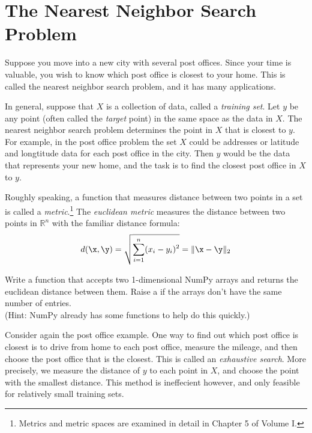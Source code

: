 \label{lab:DS3}


\section*{The Nearest Neighbor Search Problem} %

Suppose you move into a new city with several post offices.
Since your time is valuable, you wish to know which post office is closest to your home.
This is called the nearest neighbor search problem, and it has many applications.

In general, suppose that $X$ is a collection of data, called a \emph{training set}.
Let $y$ be any point (often called the \emph{target} point) in the same space as the data in $X$.
The nearest neighbor search problem determines the point in $X$ that is closest to $y$.
For example, in the post office problem the set $X$ could be addresses or latitude and longtitude data for each post office in the city.
Then $y$ would be the data that represents your new home, and the task is to find the closest post office in $X$ to $y$.

\begin{problem} %
Roughly speaking, a function that measures distance between two points in a set is called a \emph{metric}.\footnote{Metrics and metric spaces are examined in detail in Chapter 5 of Volume I.}
The \emph{euclidean metric} measures the distance between two points in $\mathbb{R}^n$ with the familiar distance formula:
\[
d(\x,\y) = \sqrt{\displaystyle\sum_{i=1}^n (x_i - y_i)^2} = \| \x - \y \|_2
\]

Write a function that accepts two 1-dimensional NumPy arrays and returns the euclidean distance between them.
Raise a  if the arrays don't have the same number of entries.
\\
(Hint: NumPy already has some functions to help do this quickly.)
\end{problem}

Consider again the post office example.
One way to find out which post office is closest is to drive from home to each post office, measure the mileage, and then choose the post office that is the closest.
This is called an \emph{exhaustive search}.
More precisely, we measure the distance of $y$ to each point in $X$, and choose the point with the smallest distance.
This method is ineffecient however, and only feasible for relatively small training sets.

